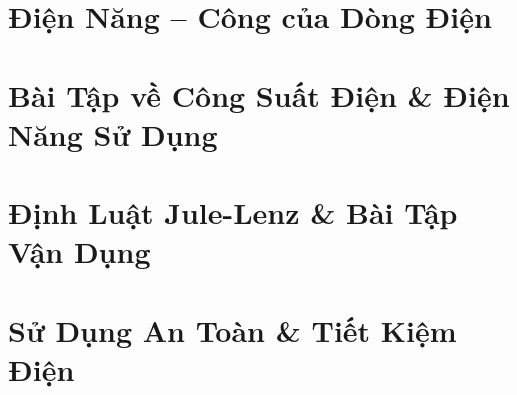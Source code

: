 \documentclass{article}
\begin{document}

\section{Điện Năng -- Công của Dòng Điện}


\section{Bài Tập về Công Suất Điện \& Điện Năng Sử Dụng}


\section{Định Luật Jule-Lenz \& Bài Tập Vận Dụng}


\section{Sử Dụng An Toàn \& Tiết Kiệm Điện}


\printbibliography[heading=bibintoc]
	
\end{document}
